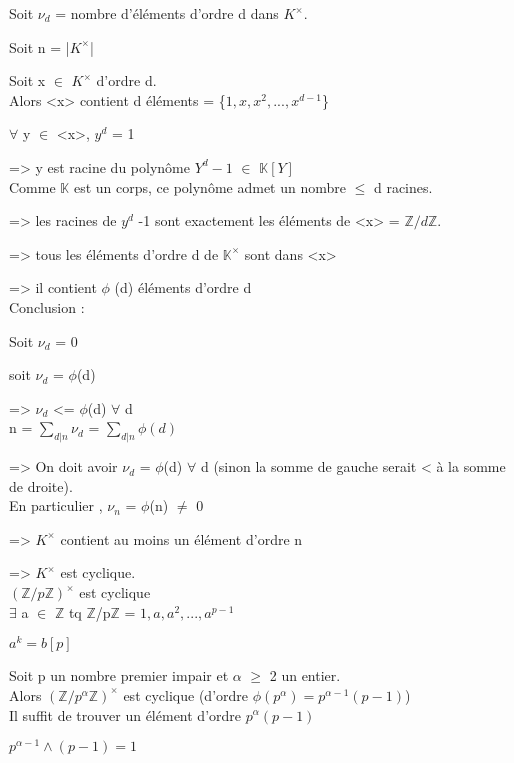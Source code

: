 \begin{dem}
	Soit $\nu_{d}$ = nombre d'éléments d'ordre d dans $K^{\times}$.
	
	Soit n = |$K^{\times}$|
	
	Soit x $\in$ $K^{\times}$ d'ordre d.\\
	Alors <x> contient  d éléments = \{$1,x,x^{2}, ..., x^{d-1}$\}
	
	$\forall$ y $\in$ <x>, $y^{d}$ = 1
	
	=> y est racine du polynôme $Y^{d} -1$ $\in$ $\mathbb{K}[Y]$\\
	Comme $\mathbb{K}$ est un corps, ce polynôme admet un nombre $\leq$ d racines.
	
	=> les racines de $y^{d}$ -1 sont exactement les éléments de <x> = $\mathbb{Z}/d\mathbb{Z}$.
	
	=> tous les éléments d'ordre d de $\mathbb{K}^{\times}$ sont dans <x>
	
	=> il contient $\phi$ (d) éléments d'ordre d\\
	Conclusion : 	
	
	Soit $\nu_{d}$ = 0
	
	soit  $\nu_{d}$ = $\phi$(d)
		
	=>  $\nu_{d}$ <= $\phi$(d) $\forall$ d\\
	n = $\sum_{d|n} \nu_{d}$ = $\sum_{d|n} \phi(d)$
	
	=> On doit avoir $\nu_{d}$ = $\phi$(d) $\forall$ d
	(sinon la somme de gauche serait < à la somme de droite).\\
	En particulier , $\nu_{n}$ = $\phi$(n) $\not=$ 0
	
	=> $K^{\times}$ contient au moins un élément d'ordre n
	
	=>  $K^{\times}$ est cyclique.\\
	$(\mathbb{Z}/p\mathbb{Z})^{\times}$ est cyclique \\
	$\exists$ a $\in$ $\mathbb{Z}$ tq $\mathbb{Z}$/p$\mathbb{Z}$ = {$1,a,a^{2}, ..., a^{p-1}$}
	
	$a^{k} = b[p]$
\end{dem}
\begin{prop}
	Soit p un nombre premier impair et $\alpha$ $\geq$ 2 un entier.\\
	Alors $(\mathbb{Z}/p^{\alpha}\mathbb{Z})^{\times}$ est cyclique (d'ordre $\phi(p^\alpha) = p^{\alpha-1} (p-1)$)\\
	Il suffit de trouver un élément d'ordre $p^{\alpha}(p-1)$
\end{prop}
\begin{rem}
	$p^{\alpha -1} \wedge (p-1) = 1$
\end{rem}
